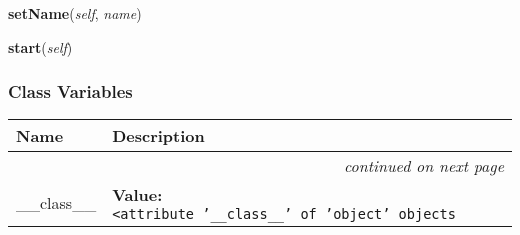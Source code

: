    \vspace{0.5ex}

    \begin{boxedminipage}{\textwidth}

    \raggedright \textbf{setName}(\textit{self}, \textit{name})

    \end{boxedminipage}

    \label{threading:Thread:start}

    \vspace{0.5ex}

    \begin{boxedminipage}{\textwidth}

    \raggedright \textbf{start}(\textit{self})

    \end{boxedminipage}



  \subsubsection{Class Variables}

\begin{longtable}{|p{}|p{}|l}
\cline{1-2}
\cline{1-2} \centering \textbf{Name} & \centering \textbf{Description}& \\
\cline{1-2}
\endhead\cline{1-2}\multicolumn{3}{r}{\small\textit{continued on next page}}\\\endfoot\cline{1-2}
\endlastfoot\raggedright \_\-\_\-c\-l\-a\-s\-s\-\_\-\_\- & \textbf{Value:} 
{\tt {\textless}\-a\-t\-t\-r\-i\-b\-u\-t\-e\-~\-'\-\_\-\_\-c\-l\-a\-s\-s\-\_\-\_\-'\-~\-o\-f\-~\-'\-o\-b\-j\-e\-c\-t\-'\-~\-o\-b\-j\-e\-c\-t\-s\-{\textgreater}\-}&\\
\cline{1-2}
\end{longtable}

